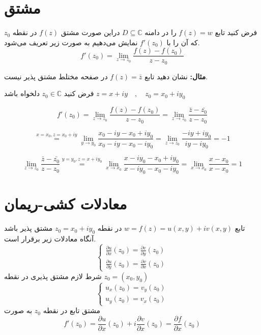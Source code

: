 \documentclass[12pt]{report}
\begin{document}
 	 	 	  \section{مشتق}
 	 	 	  فرض کنید تابع
 	 	 	  $f(z) = w$
 	 	 	  را در دامنه 
 	 	 	  $D \subseteq \mathbb{C}$
 	 	 	  دراین صورت مشتق
 	 	 	  $f(z)$
 	 	 	  در نقطه
 	 	 	  $z_0$
 	 	 	  که آن را با 
 	 	 	  $f'(z_0)$
 	 	 	  نمایش می‌دهیم به صورت زیر تعریف می‌شود.
 	 	 	  $$f'(z_0) =\lim_{z \to z_0} \frac{f(z) - f(z_0)}{z-z_0}$$
 	 	 	  
 	 	 	  \textbf{مثال:}
 	 	 	  نشان دهید تابع
 	 	 	  $f(z) = \bar{z}$
 	 	 	  در صفحه مختلط مشتق پذیر نیست.
 	 	 	  
 	 	 	  فرض کنید
 	 	 	  $z_0 \in \mathbb{C}$
 	 	 	  دلخواه باشد 
 	 	 	  $z = x+iy \quad , \quad z_0 = x_0 + iy_0\quad$
 	 	 	  
 	 	 	  $$f'(z_0) = \lim_{z \to z_0} \frac{f(z) - f(z_0)}{z-z_0} = \lim_{z \to z_0} \frac{\bar{z} - \bar{z_0}}{z - z_0}$$
 	 	 	  
 	 	 	  $$\overset{x = x_0 , z = x_0 + iy}{=} \lim_{y \to y_0} \frac{x_0 - iy - x_0 + iy_0}{x_0 - iy - x_0 - iy_0} = \lim_{z \to z_0} \frac{-iy+iy_0}{iy - iy_0} = -1$$
 	 	 	  
 	 	 	  $$\lim_{z \to z_0} \frac{\bar{z} - \bar{z_0}}{z - z_0}\overset{y = y_0 , z = x + iy_0}{=} \lim_{x \to x_0} \frac{x- iy_0 - x_0 + iy_0}{x - iy_0 - x_0 - iy_0} = \lim_{x \to x_0}\frac{x - x_0}{x - x_0} = 1$$
 	 	 	  
 	 	 	  \section{معادلات کشی-ریمان}
 	 	 	  تابع
 	 	 	  $w = f(z) = u(x, y) + i v(x, y)$
 	 	 	  در نقطه
 	 	 	  $z_0 = x_0 + iy_0$
 	 	 	  مشتق پذیر باشد آنگاه معادلات زیر برقرار است.
 	 	 	  \[
 	 	 	  \begin{cases}
 	 	 	  	\frac{\partial u}{\partial x} (z_0) = \frac{\partial v}{\partial y} (z_0)\\
				\frac{\partial u}{\partial y} (z_0) = \frac{\partial v}{\partial x} (z_0)
 	 	 	  \end{cases}
 	 	 	  \]
 	 	 	  شرط لازم مشتق پذیری در نقطه 
 	 	 	  $z_0=(x_0, y_0)$
 	 	 	  \[
 	 	 	  \begin{cases}
 	 	 	  	u_x(z_0) = v_y(z_0)\\
 	 	 	  	u_y(z_0) = v_x(z_0)
 	 	 	  \end{cases}
 	 	 	  \]
 	 	 	  مشتق تابع در نقطه 
 	 	 	  $z_0$
 	 	 	  به صورت 
 	 	 	  $$f'(z_0) = \frac{\partial u}{\partial x}(z_0) + i\frac{\partial v}{\partial x}(z_0) = \frac{\partial f}{\partial x}(z_0)$$
 	 	 	  
\end{document}
